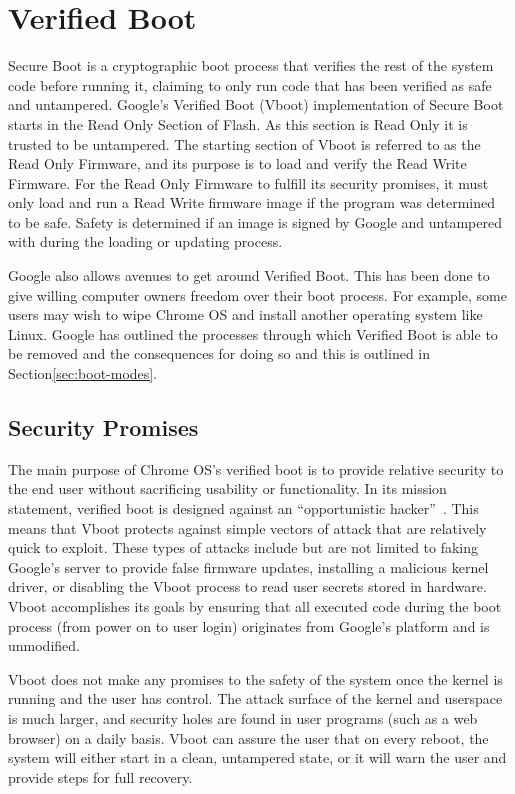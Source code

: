 \documentclass[../report.tex]{subfiles}
\begin{document}
\onehalfspacing

\newpage
\section{Verified Boot}

Secure Boot is a cryptographic boot process that verifies the rest of the system code before running it, claiming to only run code that has been verified as safe and untampered.
Google's Verified Boot (Vboot) implementation of Secure Boot starts in the Read Only Section of Flash. 
As this section is Read Only it is trusted to be untampered.
The starting section of Vboot is referred to as the Read Only Firmware, and its purpose is to load and verify the Read Write Firmware.
For the Read Only Firmware to fulfill its security promises, it must only load and run a Read Write firmware image if the program was determined to be safe.
Safety is determined if an image is signed by Google and untampered with during the loading or updating process.

Google also allows avenues to get around Verified Boot.
This has been done to give willing computer owners freedom over their boot process.
For example, some users may wish to wipe Chrome OS and install another operating system like Linux.
Google has outlined the processes through which Verified Boot is able to be removed and the consequences for doing so and this is outlined in Section\ref{sec:boot-modes}.


\subsection{Security Promises}

The main purpose of Chrome OS's verified boot is to provide relative security to the end user without sacrificing usability or functionality. 
In its mission statement, verified boot is designed against an ``opportunistic hacker''~\cite{vboot-design-doc}.
This means that Vboot protects against simple vectors of attack that are relatively quick to exploit.
These types of attacks include but are not limited to faking Google's server to provide false firmware updates, installing a malicious kernel driver, or disabling the Vboot process to read user secrets stored in hardware.
Vboot accomplishes its goals by ensuring that all executed code during the boot process (from power on to user login) originates from Google's platform and is unmodified. 

Vboot does not make any promises to the safety of the system once the kernel is running and the user has control. 
The attack surface of the kernel and userspace is much larger, and security holes are found in user programs (such as a web browser) on a daily basis.
Vboot can assure the user that on every reboot, the system will either start in a clean, untampered state, or it will warn the user and provide steps for full recovery.
\end{document}
